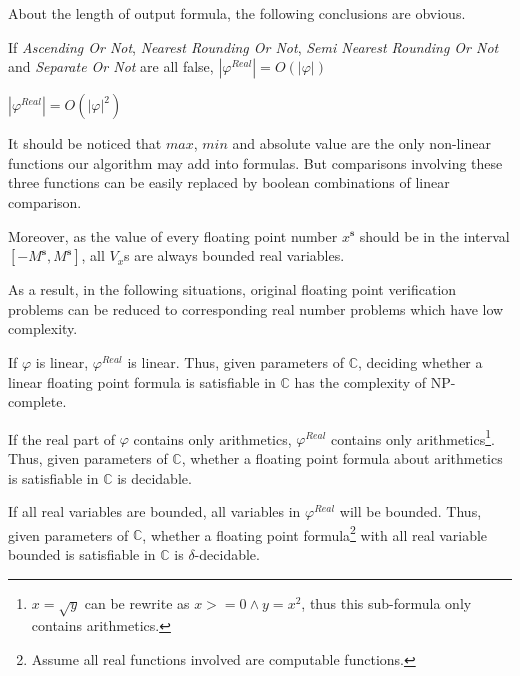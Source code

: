 \documentclass[12pt]{article}
\newcommand{\s}{\mathbf{s}}
\begin{document}
About the length of output formula, the following conclusions are obvious.

\begin{theorem}
If  \emph{Ascending Or Not}, \emph{Nearest Rounding Or Not}, \emph{Semi Nearest Rounding Or Not} and \emph{Separate Or Not} are all false, $\left|\varphi^{Real}\right| = O(\left|\varphi\right|)$
\end{theorem}

\begin{theorem}
$\left|\varphi^{Real}\right| = O(\left|\varphi\right|^2)$
\end{theorem}

It should be noticed that $max$, $min$ and absolute value are the only non-linear functions our algorithm may add into formulas. But comparisons involving these three functions can be easily replaced by boolean combinations of linear comparison.

Moreover, as the value of every floating point number $x^\s$ should be in the interval $[-M^\s, M^\s]$, all $V_x$s are always bounded real variables.

As a result, in the following situations, original floating point verification problems can be reduced to corresponding real number problems which have low complexity.

\begin{theorem}
If $\varphi$ is linear, $\varphi^{Real}$ is linear. Thus, given parameters of $\mathbb{C}$, deciding whether a linear floating point formula is satisfiable in $\mathbb{C}$ has the complexity of NP-complete.
\end{theorem}

\begin{theorem}
If the real part of $\varphi$ contains only arithmetics, $\varphi^{Real}$ contains only arithmetics\footnote{$x = \sqrt{y}$ can be rewrite as $x>=0 \wedge y = x^2$, thus this sub-formula only contains arithmetics.}. Thus, given parameters of $\mathbb{C}$, whether a floating point formula about arithmetics is satisfiable in $\mathbb{C}$ is decidable.
\end{theorem}

\begin{theorem}
If all real variables are bounded, all variables in $\varphi^{Real}$ will be bounded. Thus, given parameters of $\mathbb{C}$, whether a floating point formula\footnote{Assume all real functions involved are computable functions.} with all real variable bounded is satisfiable in $\mathbb{C}$ is $\delta$-decidable.
\end{theorem}
\end{document}
